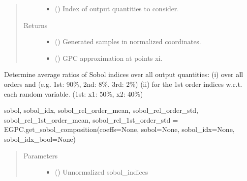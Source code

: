 \documentclass[letterpaper,10pt,english,openany,oneside]{sphinxmanual}
\begin{document}
\begin{fulllineitems}
\begin{fulllineitems}
\begin{quote}
\begin{description}
\begin{itemize}
\item {} 
 (\sphinxstyleliteralemphasis{\sphinxupquote{{[}}}\sphinxstyleliteralemphasis{\sphinxupquote{{]} }}\sphinxstyleliteralemphasis{\sphinxupquote{, }}\sphinxstyleliteralemphasis{\sphinxupquote{, }}) \textendash{} Index of output quantities to consider.

\end{itemize}

\item[{Returns}] \leavevmode
\begin{itemize}
\item {} 
 () \textendash{} Generated samples in normalized coordinates.

\item {} 
 () \textendash{} GPC approximation at points xi.

\end{itemize}


\end{description}\end{quote}

\end{fulllineitems}


\begin{fulllineitems}
\label{\detokenize{pygpc:pygpc.EGPC.EGPC.get_sobol_composition}}
Determine average ratios of Sobol indices over all output quantities:
(i) over all orders and (e.g. 1st: 90\%, 2nd: 8\%, 3rd: 2\%)
(ii) for the 1st order indices w.r.t. each random variable. (1st: x1: 50\%, x2: 40\%)

sobol, sobol\_idx, sobol\_rel\_order\_mean, sobol\_rel\_order\_std, sobol\_rel\_1st\_order\_mean, sobol\_rel\_1st\_order\_std
= EGPC.get\_sobol\_composition(coeffs=None, sobol=None, sobol\_idx=None, sobol\_idx\_bool=None)
\begin{quote}\begin{description}
\item[{Parameters}] \leavevmode\begin{itemize}
\item {} 
 (\sphinxstyleliteralemphasis{\sphinxupquote{{[}}}\sphinxstyleliteralemphasis{\sphinxupquote{{]} }}) \textendash{} Unnormalized sobol\_indices


\end{itemize}
\end{description}
\end{quote}
\end{fulllineitems}
\end{fulllineitems}
\end{document}
